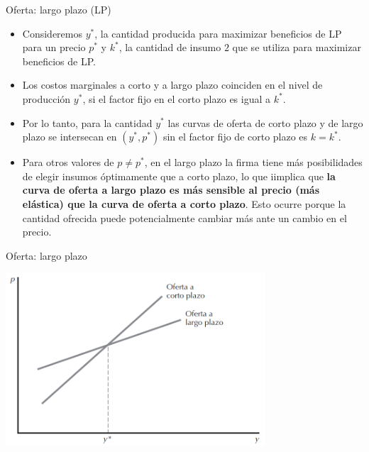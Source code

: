 \documentclass{beamer}
\theoremstyle{definition}
\begin{document}
\begin{frame}{Oferta: largo plazo (LP)}
\begin{itemize}
\item Consideremos $y^*$, la cantidad producida para maximizar beneficios de LP para un precio $p^*$ y $k^*$, la cantidad de insumo $2$ que se utiliza para maximizar beneficios de LP.
\item %
Los costos marginales a corto y a largo plazo coinciden en el nivel de producción $y^*$, si el factor fijo en el corto plazo es igual a $k^*$.
\item Por lo tanto, para la cantidad $y^*$ las curvas de oferta de corto plazo y de largo plazo se intersecan en $(y^*,p^*)$ sin el factor fijo de corto plazo es $k=k^*$.
\item %
Para otros valores de $p\neq p^*$, en el largo plazo la firma tiene más posibilidades de elegir insumos óptimamente que a corto plazo, lo que iimplica que \textbf{la curva de oferta a largo plazo es más sensible al precio (más elástica) que la curva de oferta a corto plazo}. Esto ocurre porque la cantidad ofrecida puede potencialmente cambiar más ante un cambio en el precio.
\end{itemize}
\end{frame}

\begin{frame}{Oferta: largo plazo}
\begin{center}
\includegraphics[width=3.8in]{figures4/LP.png}
\end{center}
\end{frame}
\end{document}
